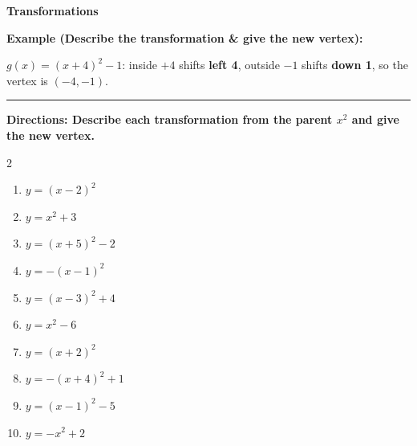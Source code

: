 \documentclass[12pt]{article}
\begin{document}
\vspace{0.35cm}

\begin{center}{\Large \textbf{Transformations}}\end{center}\vspace{0.2cm}
\textbf{Example (Describe the transformation \& give the new vertex):}

$g(x)=(x+4)^{2}-1$: inside $+4$ shifts \textbf{left 4}, outside $-1$ shifts \textbf{down 1}, so the vertex is $(-4,-1)$.

\vspace{0.2cm}\hrule\vspace{0.35cm}
\textbf{Directions: Describe each transformation from the parent $x^2$ and give the new vertex.}

\begin{multicols}{2}
\begin{enumerate}[label=\textbf{\arabic*.}, start=1, itemsep=2cm]
  \item $\displaystyle y=(x-2)^{2}$
  \item $\displaystyle y=x^{2}+3$
  \item $\displaystyle y=(x+5)^{2}-2$
  \item $\displaystyle y=-(x-1)^{2}$
  \item $\displaystyle y=(x-3)^{2}+4$
  \item $\displaystyle y=x^{2}-6$
  \item $\displaystyle y=(x+2)^{2}$
  \item $\displaystyle y=-(x+4)^{2}+1$
  \item $\displaystyle y=(x-1)^{2}-5$
  \item $\displaystyle y=-x^{2}+2$
\end{enumerate}
\end{multicols}
\end{document}
